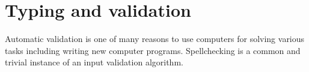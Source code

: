 \documentclass[11pt,oneside,a4paper]{report}
\begin{document}
\chapter{Typing and validation}
Automatic validation is one of many reasons to use computers for solving various tasks including writing new computer programs.
Spellchecking is a common and trivial instance of an input validation algorithm. 


\end{document}
